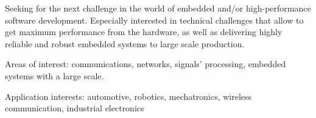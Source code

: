 


\begin{cventries}


\begin{flushleft}

Seeking for the next challenge in the world of embedded and/or high-performance software development. 
Especially interested in technical challenges that allow to get maximum performance from the hardware,
as well as delivering highly reliable and robust embedded systems to large scale production.
\newline

Areas of interest: communications, networks, signals' processing, embedded systems with a large scale. 
\newline

Application interests: automotive, robotics, mechatronics, wireless communication, industrial electronics
\end{flushleft}
    


\end{cventries}